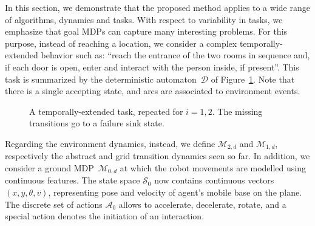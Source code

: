 \documentclass[letterpaper]{article} %
\theoremstyle{plain}
\theoremstyle{definition}
\theoremstyle{remark}
\newcommand{\SetSym}[1]{\mathcal{#1}}
\newcommand{\States}{\SetSym{S}}
\newcommand{\Actions}{\SetSym{A}}
\newcommand{\Model}{\SetSym{M}}
\newcommand{\Automa}{\mathcal{D}}
\begin{document}
In this section, we demonstrate that the proposed method applies to a wide range of algorithms, dynamics and tasks.
With respect to variability in tasks, we emphasize that goal MDPs can capture many interesting problems.
For this purpose, instead of reaching a location, we consider a complex temporally-extended behavior such as:
``reach the entrance of the two rooms in sequence and, if each door is open, enter and interact with the person inside, if present''.
This task is summarized by the deterministic automaton~$\Automa$ of Figure~\ref{fig:office-automa}.
Note that there is a single accepting state, and arcs are associated to environment events.
\begin{figure}
\centering
{}
\caption{A temporally-extended task, repeated for $i = 1, 2$.
The missing transitions go to a failure sink state.}
\label{fig:office-automa}
\end{figure}

Regarding the environment dynamics, instead, we define $\Model_{2,d}$ and $\Model_{1,d}$, respectively the abstract and grid transition dynamics seen so far.
In addition, we consider a ground MDP~$\Model_{0,d}$ at which the robot movements are modelled using continuous features.
The state space $\States_0$ now contains continuous vectors $(x, y, \theta, v)$,
representing pose and velocity of agent's mobile base on the plane.
The discrete set of actions $\Actions_0$ allows to accelerate, decelerate, rotate, and a special action denotes the initiation of an interaction.
\end{document}

